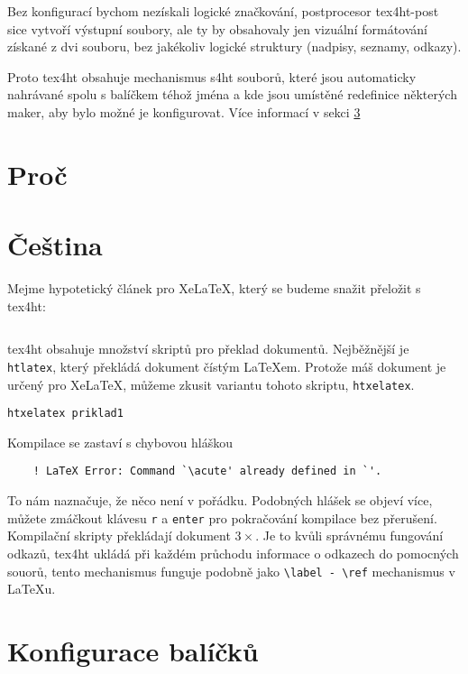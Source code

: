 \documentclass{article}
\begin{document}
Bez konfigurací bychom nezískali logické značkování, postprocesor \gls{tex4ht-post} sice vytvoří výstupní soubory, ale ty by obsahovaly jen vizuální formátování získané z dvi souboru, bez jakékoliv logické struktury
(nadpisy, seznamy, odkazy).

Proto \gls{tex4ht} obsahuje mechanismus \gls{s4ht} souborů, které jsou 
automaticky nahrávané spolu s balíčkem téhož jména a kde jsou umístěné 
redefinice některých maker, aby bylo možné je konfigurovat. Více informací 
v sekci \ref{sec:config}

\section{Proč }

\section{Čeština}

Mejme hypotetický článek pro Xe\LaTeX, který se budeme snažit přeložit s \gls{tex4ht}:

\inputminted{latex}{priklady/priklad1.tex}

\gls{tex4ht} obsahuje množství skriptů pro překlad dokumentů. Nejběžnější 
je \verb|htlatex|, který překládá dokument čístým \LaTeX em. Protože máš 
dokument je určený pro Xe\LaTeX, můžeme zkusit variantu tohoto skriptu,
\verb|htxelatex|. 

\begin{verbatim}
htxelatex priklad1
\end{verbatim}

Kompilace se zastaví s chybovou hláškou

\begin{verbatim}
	! LaTeX Error: Command `\acute' already defined in `'.
\end{verbatim}

To nám naznačuje, že něco není v pořádku. Podobných hlášek se objeví více,
můžete zmáčkout klávesu \verb|r| a \verb|enter| pro pokračování kompilace bez 
přerušení. Kompilační skripty překládají dokument \(3 \times\). 
Je to kvůli správnému fungování odkazů, \gls{tex4ht} ukládá při každém průchodu
informace o odkazech do pomocných souorů, tento mechanismus funguje
podobně jako \verb|\label - \ref| mechanismus v \LaTeX u.
\section{Konfigurace balíčků}\label{sec:config}

\printglossary
\printbibliography
\end{document}
